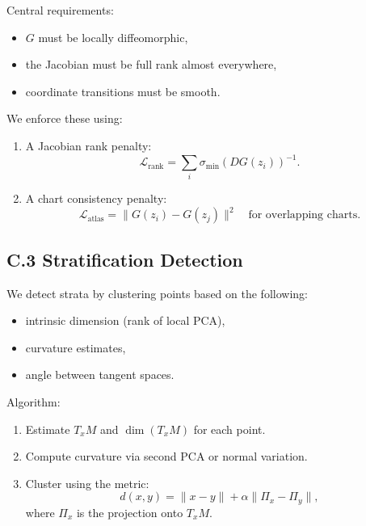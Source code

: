 \documentclass[11pt,a4paper,twocolumn]{article}
\begin{document}
Central requirements:
\begin{itemize}
\item $G$ must be locally diffeomorphic,
\item the Jacobian must be full rank almost everywhere,
\item coordinate transitions must be smooth.
\end{itemize}

We enforce these using:

\begin{enumerate}
\item A Jacobian rank penalty:
\[
\mathcal{L}_{\mathrm{rank}} = \sum_i \sigma_{\min}(DG(z_i))^{-1}.
\]
\item A chart consistency penalty:
\[
\mathcal{L}_{\mathrm{atlas}} =
\|G(z_i) - G(z_j)\|^2 \quad \text{for overlapping charts}.
\]
\end{enumerate}


\subsection*{C.3 Stratification Detection}

We detect strata by clustering points based on the following:

\begin{itemize}
\item intrinsic dimension (rank of local PCA),
\item curvature estimates,
\item angle between tangent spaces.
\end{itemize}

Algorithm:

\begin{enumerate}
\item Estimate $T_xM$ and $\dim(T_xM)$ for each point.
\item Compute curvature via second PCA or normal variation.
\item Cluster using the metric:
\[
d(x,y) =
\|x-y\| + \alpha\|\Pi_x - \Pi_y\|,
\]
where $\Pi_x$ is the projection onto $T_xM$.
\end{enumerate}

\end{document}
